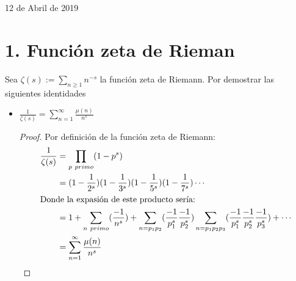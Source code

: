 \documentclass[12pt]{article}
\begin{document}
\begin{center}
        \vspace{2cm}
        \begin{center}
            {\large 12 de Abril de 2019}
        \end{center}                                                             
    \end{center}

    \newpage


\section*{1. Función zeta de Rieman}
Sea $\zeta(s) := \sum_{n \geq 1} n^{-s} $ la función zeta de Riemann. Por demostrar las siguientes identidades
\begin{itemize}
    \item $\frac{1}{\zeta (s)} = \sum_{n = 1}^{\infty} \frac{\mu(n)}{n^s}$
    \begin{proof}
        Por definición de la función zeta de Riemann:
        \begin{align*}
        \frac{1}{\zeta (s)}
            &= \prod_{p \ primo} (1 - p^{s}) \\
            &= (1 - \frac{1}{2^s}) (1 - \frac{1}{3^s}) (1 - \frac{1}{5^s}) (1 - \frac{1}{7^s}) \cdots \\
            \intertext{Donde la expasión de este producto sería:}
            &= 1 + \sum_{n \ primo}(\frac{-1}{n^s}) + \sum_{n = p_1 p_2}(\frac{-1}{p_1^s} \frac{-1}{p_2^s})
                \sum_{n = p_1 p_2 p_3}(\frac{-1}{p_1^s} \frac{-1}{p_2^s} \frac{-1}{p_3^s}) + \cdots \\
            &= \sum_{n = 1}^{\infty} \frac{\mu(n)}{n^s}
        \end{align*}
    \end{proof}
    

\end{itemize}
\end{document}
